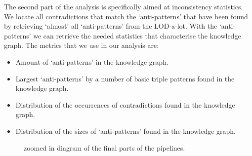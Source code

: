 \documentclass[11pt,letterpaper ,oneside ]{book}
\begin{document}
The second part of the analysis is specifically aimed at inconsistency statistics. We locate all contradictions that match the `anti-patterns' that have been found by retrieving `almost' all `anti-patterns' from the LOD-a-lot. With the `anti-patterns' we can retrieve the needed statistics that characterise the knowledge graph. The metrics that we use in our analysis are:
\begin{itemize}
	\item Amount of `anti-patterns' in the knowledge graph.
	\item Largest `anti-patterns' by a number of basic triple patterns found in the knowledge graph.
	\item Distribution of the occurrences of contradictions found in the knowledge graph.
	\item Distribution of the sizes of `anti-patterns' found in the knowledge graph.
\end{itemize} 

\begin{figure}[!t]
	\hfill
	\caption{zoomed in diagram of the final parts of the pipelines.}
	\label{fig:PipelinePart45}
\end{figure}
\end{document}
